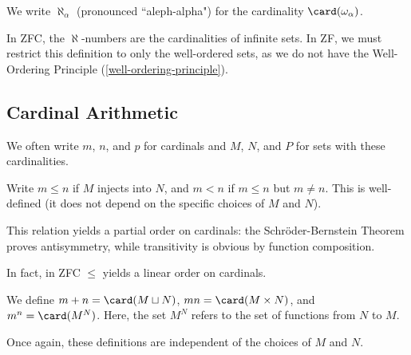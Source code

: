 \documentclass{article}
\begin{document}
\begin{definition}
    We write $\aleph_\alpha$ (pronounced ``aleph-alpha") for the cardinality $\card(\omega_\alpha)$.
\end{definition}

\begin{note}
	In ZFC, the $\aleph$-numbers are the cardinalities of infinite sets. In ZF, we must restrict this definition to only the well-ordered sets, as we do not have the Well-Ordering Principle (\ref{well-ordering-principle}).
\end{note}


\subsection{Cardinal Arithmetic}

\begin{note}
	We often write $m$, $n$, and $p$ for cardinals and $M$, $N$, and $P$ for sets with these cardinalities.
\end{note}

\begin{definition}
    Write $m \leq n$ if $M$ injects into $N$, and $m < n$ if $m \leq n$ but $m \neq n$. This is well-defined (it does not depend on the specific choices of $M$ and $N$).
\end{definition}

\begin{corollary}
    This relation yields a partial order on cardinals: the Schr\"oder-Bernstein Theorem proves antisymmetry, while transitivity is obvious by function composition.
\end{corollary}

\begin{corollary}
    In fact, in ZFC $\leq$ yields a linear order on cardinals.
\end{corollary}

\begin{definition}
    We define $m + n = \card(M \sqcup N)$, $mn = \card(M \times N)$, and $m^n = \card(M^N)$. Here, the set $M^N$ refers to the set of functions from $N$ to $M$.
    
    Once again, these definitions are independent of the choices of $M$ and $N$.
\end{definition}
\end{document}
